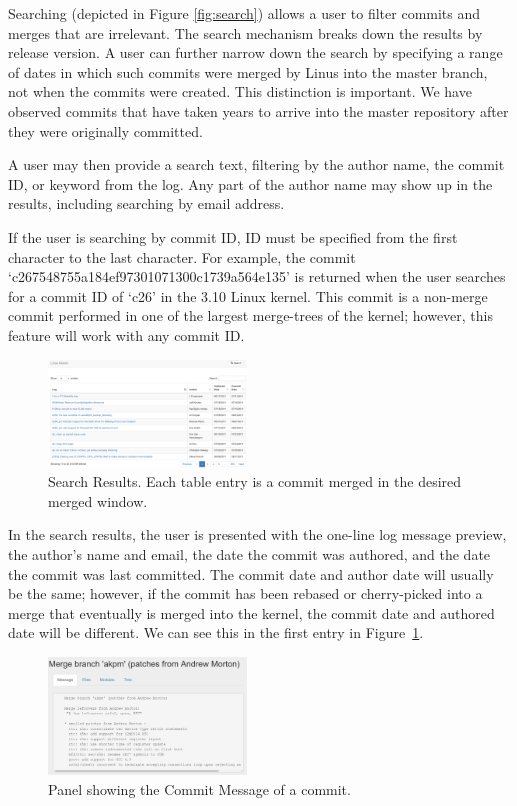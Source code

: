 \documentclass[conference, draftclsnofoot, draft]{IEEEtran}
\begin{document}
Searching (depicted in Figure \ref{fig:search}) allows a user to filter commits and
merges that are irrelevant. The search mechanism breaks down the results by release
version. A user can further narrow down the search by specifying a range of dates in
which such commits were merged by Linus into the master branch, not when the commits
were created. This distinction is important. We have observed commits that have
taken years to arrive into the master repository after they were originally
committed.

A user may then provide a search text, filtering by the author name, the commit ID,
or keyword from the log. Any part of the author name may show up in the results,
including searching by email address.

If the user is searching by commit ID, ID must be specified from the first character
to the last character. For example, the commit
`c267548755a184ef97301071300c1739a564e135' is returned when the user searches for a
commit ID of `c26' in the 3.10 Linux kernel. This commit is a non-merge commit
performed in one of the largest merge-trees of the kernel; however, this feature
will work with any commit ID.

\begin{figure}
        \centering
        \includegraphics[width=0.47\textwidth]{figures/search_results_2.png}
        \caption{Search Results. Each table entry is a commit merged in the desired
                merged window.}
        \label{fig:results}
\end{figure}

In the search results, the user is presented with the one-line log message preview,
the author's name and email, the date the commit was authored, and the date the
commit was last committed. The commit date and author date will usually be the same;
however, if the commit has been rebased or cherry-picked into a merge that
eventually is merged into the kernel, the commit date and authored date will be
different. We can see this in the first entry in Figure~\ref{fig:results}.

\begin{figure}
        \centering
        \includegraphics[width=0.47\textwidth]{figures/log_view.png}
        \caption{Panel showing the Commit Message of a commit.}
        \label{fig:message}
\end{figure}
\end{document}
